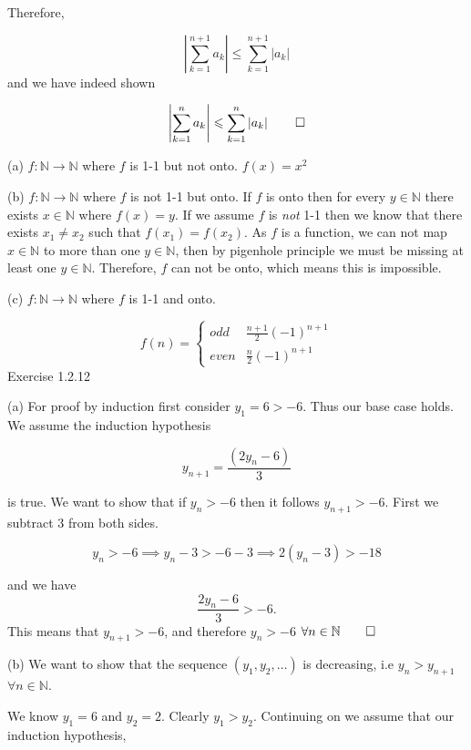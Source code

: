 \documentclass{report}
\begin{document}
Therefore,

$$
\left|\sum_{k=1}^{n+1} a_{k}\right| \leq \sum_{k=1}^{n+1}\left|a_{k}\right| $$  and we have indeed shown

$$
\left|\sum_{k=1}^{n} a_{k}\right| \leq \sum_{k=1}^{n}\left|a_{k}\right| \qed$$

\bigskip
{}
(a) $f: \mathbb{N} \rightarrow \mathbb{N}$ where $f$ is 1-1 but not onto. 
\sol $f(x) = x^2$

(b) $f: \mathbb{N} \rightarrow \mathbb{N}$ where $f$ is not 1-1 but onto. 
\sol If $f$ is onto then for every $y \in \mathbb{N}$ there exists $x \in \mathbb{N}$ where $f(x) = y$. If we assume $f$  is \textit{not} 1-1 then we know that there exists $x_1 \neq x_2$ such that $f(x_1) = f(x_2)$. As $f$ is a function, we can not map $x \in \mathbb{N}$ to more than one $y \in \mathbb{N}$, then by pigenhole principle we must be missing at least one $y \in \mathbb{N}$. Therefore, $f$ can not be onto, which means this is impossible.

(c) $f: \mathbb{N} \rightarrow \mathbb{N}$ where $f$ is 1-1 and onto. 

\sol  
\[ 
 f(n) = 
  \begin{cases} 
  odd & \frac{n+1}{2} (-1)^{n+1} \\
  even & \frac{n}{2} (-1)^{n+1}
   \end{cases}
\]
\bigskip
\qs{}
{Exercise 1.2.12}

(a) \sol For proof by induction first consider $y_1 = 6 > -6$. Thus our base case holds. 
We assume the induction hypothesis

\begin{equation}
y_{n+1}  = \frac{(2y_n -6 )}{3}
\end{equation}

is true.  We want to show that if $y_n >-6$ then it follows $y_{n+1} > -6$. First we subtract 3 from both sides.

$$y_n > -6 \implies  y_n -3  > -6 -3 \implies  2(y_n -3)  > -18$$

and we have
$$
\frac{2y_n -6 }{3} > -6.
$$
This means that $y_{n+1} > -6$, and therefore $y_n > -6$ $\forall n \in \mathbb{N} \qed$
\smallskip

(b) \sol We want to show that the sequence $(y_1, y_2, \dots)$ is decreasing, i.e $ y_{n} > y_{n+1}$ $\forall n \in \mathbb{N}$.

We know $y_1 = 6$ and $y_2 = 2$. Clearly $y_1 > y_2$. Continuing on we assume that our induction hypothesis,
\end{document}
